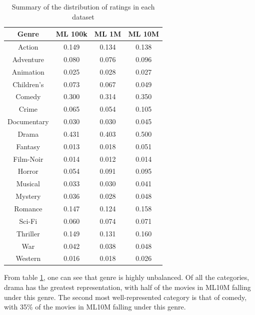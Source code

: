 \begin{table}[H]
\centering
\begin{tabular}{c | c | c | c}
\toprule
\textbf{Genre} & \textbf{ML 100k} & \textbf{ML 1M} & \textbf{ML 10M} \\
\midrule
Action & 0.149 & 0.134 & 0.138 \\
Adventure & 0.080 & 0.076 & 0.096 \\
Animation & 0.025 & 0.028 & 0.027 \\
Children's & 0.073 & 0.067 & 0.049 \\
Comedy & 0.300 & 0.314 & 0.350 \\
Crime & 0.065 & 0.054 & 0.105 \\
Documentary & 0.030 & 0.030 & 0.045 \\
Drama & 0.431 & 0.403 & 0.500 \\
Fantasy & 0.013 & 0.018 & 0.051 \\
Film-Noir & 0.014 & 0.012 & 0.014 \\
Horror & 0.054 & 0.091 & 0.095 \\
Musical & 0.033 & 0.030 & 0.041 \\
Mystery & 0.036 & 0.028 & 0.048 \\
Romance & 0.147 & 0.124 & 0.158 \\
Sci-Fi & 0.060 & 0.074 & 0.071 \\
Thriller & 0.149 & 0.131 & 0.160 \\
War & 0.042 & 0.038 & 0.048 \\
Western & 0.016 & 0.018 & 0.026 \\
\bottomrule
\end{tabular}
\caption[Movies per genre as a proportion of the total]{Summary of the distribution of ratings in each dataset}
\label{tab:ML-genres}
\end{table}

From table \ref{tab:ML-genres}, one can see that genre is highly unbalanced. Of all the categories, drama has the greatest representation, with half of the movies in ML10M falling under this genre. The second most well-represented category is that of comedy, with 35\% of the movies in ML10M falling under this genre.
